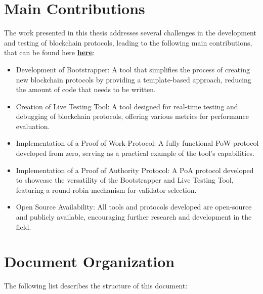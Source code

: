 \section{Main Contributions}


The work presented in this thesis addresses several challenges in the development and testing of blockchain protocols, leading to the following main contributions, that can be found here \href{https://gitlab.com/Gabulhas/tezos}{\textbf{here}}:

\begin{itemize}
\item Development of Bootstrapper: A tool that simplifies the process of creating new blockchain protocols by providing a template-based approach, reducing the amount of code that needs to be written.

\item Creation of Live Testing Tool: A tool designed for real-time testing and debugging of blockchain protocols, offering various metrics for performance evaluation.

\item Implementation of a Proof of Work Protocol: A fully functional PoW protocol developed from zero, serving as a practical example of the tool's capabilities.

\item Implementation of a Proof of Authority Protocol: A PoA protocol developed to showcase the versatility of the Bootstrapper and Live Testing Tool, featuring a round-robin mechanism for validator selection.

\item Open Source Availability: All tools and protocols developed are open-source and publicly available, encouraging further research and development in the field.

\end{itemize}


\section{Document Organization}
The following list describes the structure of this document:

